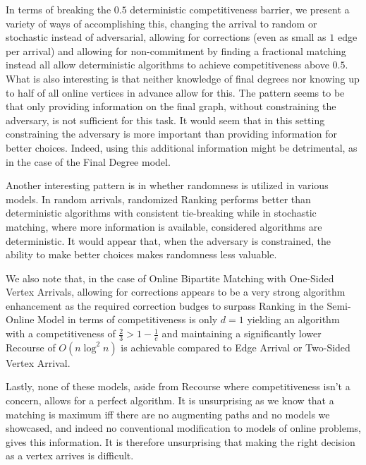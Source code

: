In terms of breaking the $0.5$ deterministic competitiveness barrier, we present a variety of ways of accomplishing this, changing the arrival to random or stochastic instead of adversarial, allowing for corrections (even as small as $1$ edge per arrival) and allowing for non-commitment by finding a fractional matching instead all allow deterministic algorithms to achieve competitiveness above $0.5$. What is also interesting is that neither knowledge of final degrees nor knowing up to half of all online vertices in advance allow for this. The pattern seems to be that only providing information on the final graph, without constraining the adversary, is not sufficient for this task. It would seem that in this setting constraining the adversary is more important than providing information for better choices. Indeed, using this additional information might be detrimental, as in the case of the Final Degree model.

Another interesting pattern is in whether randomness is utilized in various models. In random arrivals, randomized Ranking performs better than deterministic algorithms with consistent tie-breaking while in stochastic matching, where more information is available, considered algorithms are deterministic. It would appear that, when the adversary is constrained, the ability to make better choices makes randomness less valuable.

We also note that, in the case of Online Bipartite Matching with One-Sided Vertex Arrivals, allowing for corrections appears to be a very strong algorithm enhancement as the required correction budges to surpass Ranking in the Semi-Online Model in terms of competitiveness is only $d=1$ yielding an algorithm with a competitiveness of $\frac{2}{3}>1-\frac{1}{e}$ and maintaining a significantly lower Recourse of $O(n\log^2n)$ is achievable compared to Edge Arrival or Two-Sided Vertex Arrival.

Lastly, none of these models, aside from Recourse where competitiveness isn't a concern, allows for a perfect algorithm. It is unsurprising as we know that a matching is maximum iff there are no augmenting paths and no models we showcased, and indeed no conventional modification to models of online problems, gives this information. It is therefore unsurprising that making the right decision as a vertex arrives is difficult.